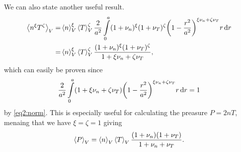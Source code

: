 \documentclass[11pt,a4paper, 
swedish, english %
]{article}
\begin{document}
We can also state another useful result.
\begin{equation}
\begin{aligned}
\ev{n^\xi T^\zeta}_V=&\ev{n}_V^\xi\ev{T}_V^\zeta
\frac{2}{a^2}\int_0^a(1+\nu_n)^\xi(1+\nu_T)^\zeta
\qty(1-\frac{r^2}{a^2})^{\xi\nu_n+\zeta\nu_T}r\id{r}\\
=&\ev{n}_V^\xi\ev{T}_V^\zeta
\frac{(1+\nu_n)^\xi(1+\nu_T)^\zeta}{1+\xi\nu_n+\zeta\nu_T},
\end{aligned}
\end{equation}
which can easily be proven since
\begin{equation}
\frac{2}{a^2}\int_0^a(1+\xi\nu_n+\zeta\nu_T)
\qty(1-\frac{r^2}{a^2})^{\xi\nu_n+\zeta\nu_T}r\id{r}
=1
\end{equation}
by \eqref{eq2:norm}.
This is especially useful for calculating the preasure $P=2nT$,
menaing that we have $\xi=\zeta=1$ giving
\begin{equation}
\ev{P}_V=\ev{n}_V\ev{T}_V
\frac{(1+\nu_n)(1+\nu_T)}{1+\nu_n+\nu_T}.
\end{equation}






\end{document}
